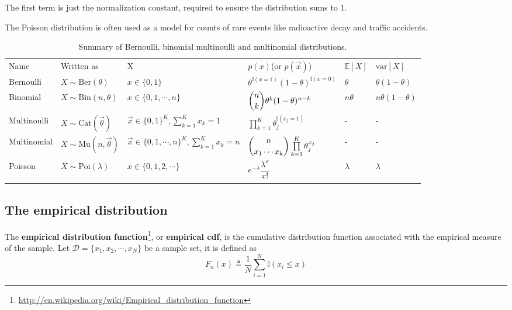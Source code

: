 \documentclass[graybox, envcountchap, twocolumn]{styles/svmult}
\begin{document}
The first term is just the normalization constant, required to ensure the distribution sums to 1.

The Poisson distribution is often used as a model for counts of rare events like radioactive decay and traffic accidents. 

\begin{table}
\caption{Summary of Bernoulli, binomial multinoulli and multinomial distributions.}
\label{tab:Summary-distribution}
\centering
\begin{tabular}{llllll}
\hline\noalign{\smallskip}
Name & Written as & X & $p(x)$(or $p(\vec{x})$) & $\mathbb{E}[X]$ & $\text{var}[X]$ \\
\noalign{\smallskip}\svhline\noalign{\smallskip}
Bernoulli & $X \sim \text{Ber}(\theta)$ & $x \in \{0,1\}$ & $\theta^{\mathbb{I}(x=1)}(1-\theta)^{\mathbb{I}(x=0)}$ & $\theta$ & $\theta(1-\theta)$ \\
Binomial & $X \sim \text{Bin}(n,\theta)$ & $x \in \{0,1,\cdots,n\}$ & $\dbinom{n}{k}\theta^k(1-\theta)^{n-k}$ & $n\theta$ & $n\theta(1-\theta)$ \\
Multinoulli & $X \sim \text{Cat}(\vec{\theta})$ & $\vec{x} \in \{0,1\}^K, \sum_{k=1}^K x_k=1$ & $\prod\limits_{k=1}^K\theta_j^{\mathbb{I}(x_j=1)}$ & - & - \\
Multinomial & $X \sim \text{Mu}(n,\vec{\theta})$ & $\vec{x} \in \{0,1,\cdots,n\}^K, \sum_{k=1}^K x_k=n$ & $\dbinom{n}{x_1 \cdots x_k} \prod\limits_{k=1}^K\theta_j^{x_j}$ & - & - \\
Poisson & $X \sim \text{Poi}(\lambda)$ & $x \in \{0,1,2,\cdots\}$ & $e^{-\lambda}\dfrac{\lambda^x}{x!}$ & $\lambda$ & $\lambda$ \\
\noalign{\smallskip}\hline
\end{tabular}
\end{table}


\subsection{The empirical distribution}
The \textbf{empirical distribution function}\footnote{\url{http://en.wikipedia.org/wiki/Empirical_distribution_function}}, or \textbf{empirical cdf}, is the cumulative distribution function associated with the empirical measure of the sample. Let $\mathcal{D}=\{x_1,x_2,\cdots,x_N\}$ be a sample set, it is defined as 
\begin{equation}
F_n(x) \triangleq \dfrac{1}{N}\sum\limits_{i=1}^N\mathbb{I}(x_i \leq x)
\end{equation}
\end{document}
